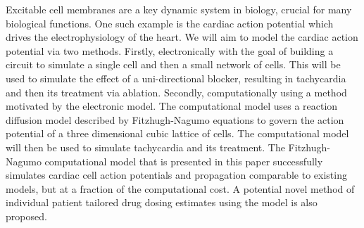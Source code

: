 Excitable cell membranes are a key dynamic system in biology, crucial for many biological functions. One such example is the cardiac action potential which drives the electrophysiology of the heart. We will aim to model the cardiac action potential via two methods. Firstly, electronically with the goal of building a circuit to simulate a single cell and then a small network of cells. This will be used to simulate the effect of a uni-directional blocker, resulting in tachycardia and then its treatment via ablation. Secondly, computationally using a method motivated by the electronic model. The computational model uses a reaction diffusion model described by Fitzhugh-Nagumo equations to govern the action potential of a three dimensional cubic lattice of cells. The computational model will then be used to simulate tachycardia and its treatment. The Fitzhugh-Nagumo computational model that is presented in this paper successfully simulates cardiac cell action potentials and propagation comparable to existing models, but at a fraction of the computational cost. A potential novel method of individual patient tailored drug dosing estimates using the model is also proposed.